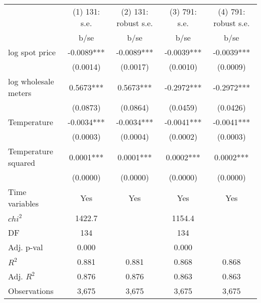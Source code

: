 \begin{tabular}{lcccc}\toprule
                    &(1) 131: s.e.   &(2) 131: robust s.e.   &(3) 791: s.e.   &(4) 791: robust s.e.   \\
                    &        b/se   &        b/se   &        b/se   &        b/se   \\
\midrule
log spot price      &     -0.0089***&     -0.0089***&     -0.0039***&     -0.0039***\\
                    &    (0.0014)   &    (0.0017)   &    (0.0010)   &    (0.0009)   \\
log wholesale meters&      0.5673***&      0.5673***&     -0.2972***&     -0.2972***\\
                    &    (0.0873)   &    (0.0864)   &    (0.0459)   &    (0.0426)   \\
Temperature         &     -0.0034***&     -0.0034***&     -0.0041***&     -0.0041***\\
                    &    (0.0003)   &    (0.0004)   &    (0.0002)   &    (0.0003)   \\
Temperature squared &      0.0001***&      0.0001***&      0.0002***&      0.0002***\\
                    &    (0.0000)   &    (0.0000)   &    (0.0000)   &    (0.0000)   \\
Time variables      &         Yes   &         Yes   &         Yes   &         Yes   \\
\midrule
\(chi^2\)           &      1422.7   &               &      1154.4   &               \\
DF                  &         134   &               &         134   &               \\
Adj. p-val          &       0.000   &               &       0.000   &               \\
\(R^2\)             &       0.881   &       0.881   &       0.868   &       0.868   \\
Adj. \(R^2\)        &       0.876   &       0.876   &       0.863   &       0.863   \\
Observations        &       3,675   &       3,675   &       3,675   &       3,675   \\
\bottomrule\end{tabular}
